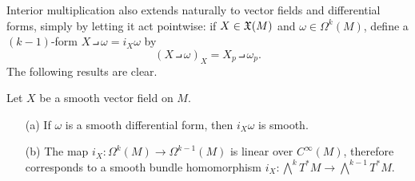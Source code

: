 Interior multiplication also extends naturally to vector fields and differential forms, simply by letting it act pointwise: if $X\in\mathfrak{X}(M)$ and $\omega\in\Omega^k(M)$, define a $(k-1)$-form $X\intprod\omega=i_X\omega$ by
\[(X\intprod\omega)_X=X_p\intprod\omega_p.\]
The following results are clear.
\begin{proposition}
Let $X$ be a smooth vector field on $M$.
\begin{itemize}
\item[(a)] If $\omega$ is a smooth differential form, then $i_X\omega$ is smooth.
\item[(b)] The map $i_X:\Omega^k(M)\to\Omega^{k-1}(M)$ is linear over $C^\infty(M)$, therefore corresponds
to a smooth bundle homomorphism $i_X:\bigwedge^kT^*M\to\bigwedge^{k-1}T^*M$.
\end{itemize}
\end{proposition}
